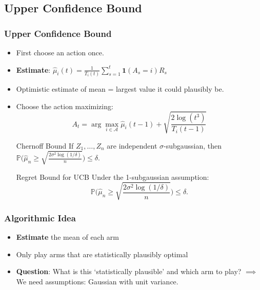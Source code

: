 \documentclass[usenames,dvipsnames, 10pt]{beamer}
\newcommand{\cA}{\mathcal{A}}
\newcommand{\Prob}{\mathbb{P}}
\begin{document}
\subsection{Upper Confidence Bound}
\begin{frame}
\frametitle{Upper Confidence Bound}

	\begin{itemize}
		\item First choose an action once. 
		
		\item \textbf{Estimate}: $\hat\mu_i(t) = \frac{1}{T_i(t)} \sum_{s = 1}^{t} \mathbf{1}(A_s = i) R_s$
		
		\item Optimistic estimate of mean = largest value it could plausibly be.
		
		
				\item Choose the action maximizing:
		\begin{equation*}
		A_t  = \arg\max_{i \in \cA} \hat\mu_i(t-1) + \sqrt{\frac{2\log(t^3)}{T_i(t-1)}}
		\end{equation*}
		
		\begin{small}
			\begin{block}{Chernoff Bound}
				\vspace{0.1cm}
				If $Z_1, \dots, Z_n$ are independent $\sigma$-subgaussian, then $
				\Prob\Big(\hat\mu_n \geq \sqrt{\frac{2\sigma^2\log(1/\delta)}{n}}\Big) \leq \delta$.
				\vspace{0.04cm}
			\end{block}
		\end{small}		
		
		
		\begin{small}
			\begin{alertblock}{Regret Bound for UCB}
				Under the 1-subgaussian assumption:
				\begin{equation*}
				\Prob\Bigg(\hat\mu_n \geq \sqrt{\frac{2\sigma^2\log(1/\delta)}{n}}\Bigg) \leq \delta.
				\end{equation*}
				\vspace{-0.35cm}
			\end{alertblock}
		\end{small}
	\end{itemize}
\end{frame}

\begin{frame}
	\frametitle{Algorithmic Idea}	
	\begin{itemize}
		\item \textbf{Estimate} the mean of each arm
		\vspace{0.3cm}
		
		\item Only play arms that are statistically plausibly optimal
		\vspace{0.3cm}
		
		\item \textbf{Question}: What is this ‘statistically plausible’ and which arm to play? $\implies$ We need assumptions: Gaussian with unit variance.
		
	\end{itemize}	
\end{frame}
\end{document}
